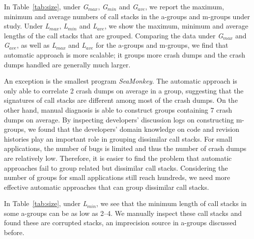In Table~\ref{tab:size}, under {\it G$_{max}$},  {\it G$_{min}$} and {\it G$_{ave}$}, we report the maximum, minimum and average numbers of call stacks in the a-groups and m-groups under study. Under {\it L$_{max}$}, {\it L$_{min}$} and {\it L$_{ave}$}, we show the maximum, minimum and average lengths of the call stacks that are grouped. Comparing the data under {\it G$_{max}$} and {\it G$_{ave}$}, as well as {\it L$_{max}$} and {\it L$_{ave}$} for the a-groups and m-groups, we find that automatic approach is more scalable; it groups more crash dumps and the crash dumps handled are generally much larger.

An exception is the smallest program {\it SeaMonkey}. The automatic approach is only able to correlate 2 crash dumps on average in a group, suggesting that the signatures of call stacks are different among most of the crash dumps. On the other hand, manual diagnosis is able to construct groups containing 7 crash dumps on average. By inspecting developers' discussion logs on constructing m-groups, we found that the developers' domain knowledge on code and revision histories play an important role in grouping dissimilar call stacks. For small applications, the number of bugs is limited and thus the number of crash dumps are relatively low. Therefore, it is easier to find the problem that automatic approaches fail to group related but dissimilar call stacks. Considering the number of groups for small applications still reach hundreds, we need more effective automatic approaches that can group dissimilar call stacks.

In Table~\ref{tab:size}, under {\it L$_{min}$}, we see that the minimum length of call stacks in some a-groups can be as low as 2--4. We manually inspect these call stacks and found these are corrupted stacks, an imprecision source in a-groups discussed before.


 

